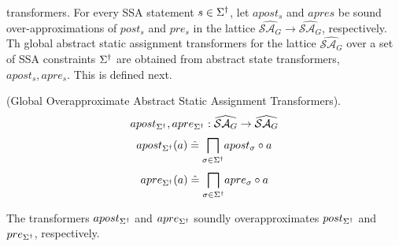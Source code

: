 transformers.  For every SSA statement $s \in \Sigma^\dagger$, let
$apost_{s}$ and $apre{s}$ be sound over-approximations of $post_{s}$ and
$pre_{s}$ in the lattice $\widehat{\mathcal{SA}_G} \rightarrow 
\widehat{\mathcal{SA}_G}$, respectively. 
%
Th global abstract static assignment transformers for the 
lattice $\widehat{\mathcal{SA}_G}$ over a set of SSA constraints 
$\Sigma^\dagger$ are obtained from abstract state transformers, 
$apost_s, apre_s$. This is defined next.
%
\begin{definition} (Global Overapproximate Abstract Static Assignment Transformers). 
  \[ 
     apost_{\Sigma^\dagger}, apre_{\Sigma^\dagger} : \widehat{\mathcal{SA}_G}
     \rightarrow \widehat{\mathcal{SA}_{G}} 
   \]
   \[
     apost_{\Sigma^\dagger}(a) \mathrel{\hat=} 
     \underset{\sigma \in \Sigma^\dagger}{\bigsqcap} apost_{\sigma} \circ a 
   \]
  \[
     apre_{\Sigma^\dagger}(a) \mathrel{\hat=} 
     \underset{\sigma \in \Sigma^\dagger}{\bigsqcap} apre_{\sigma} \circ a 
   \]
\end{definition}
%
The transformers $apost_{\Sigma^\dagger}$ and $apre_{\Sigma^\dagger}$ soundly overapproximates 
$post_{\Sigma^\dagger}$ and $pre_{\Sigma^\dagger}$, respectively. 
%
